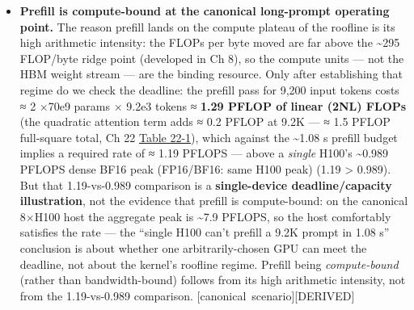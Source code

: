 \begin{itemize}
  \mbox{{[}canonical scenario{]}}\hspace{0pt}\mbox{{[}DERIVED{]}}. (This is an operating-point
  property, not an identity, and it is a \textbf{weight-only} statement:
  at high batch decode climbs the intensity slope. With the canonical
  9.2K KV re-read included, use one denominator rule --- count the
  weight bytes and the KV bytes whenever both terms are in the
  numerator. At batch 1 the intensity is 164.1 GFLOP (140 projection +
  24.1 attention; the attention term is 4·L·d\_model·n\_layers = 4 ×
  9,200 × 8,192 × 80 ≈ 24.1 GFLOP) ÷ (140 GB weights + 24.1 GB of
  canonical 9.2K FP16 KV) ≈ \textbf{1.0 FLOP/byte}. At batch 32 it is 32
  × 164.1 = 5,251 GFLOP ÷ (140 + 32 × 24.1 = 911 GB) ≈ \textbf{5.8
  FLOP/byte}, and it approaches the KV-only asymptote 164.1 ÷ 24.1 ≈ 6.8
  FLOP/byte as batch grows. Every one of these values is far below the
  \textasciitilde295 FLOP/byte ridge, so decode stays bandwidth-bound
  across this batch range --- Ch 8.)
\item
  \textbf{Prefill is compute-bound at the canonical long-prompt
  operating point.} The reason prefill lands on the compute plateau of
  the roofline is its high arithmetic intensity: the FLOPs per byte
  moved are far above the \textasciitilde295 FLOP/byte ridge point
  (developed in Ch 8), so the compute units --- not the HBM weight
  stream --- are the binding resource. Only after establishing that
  regime do we check the deadline: the prefill pass for 9,200 input
  tokens costs ≈ 2 ×70e9 params × 9.2e3 tokens ≈ \textbf{1.29 PFLOP of
  linear (2NL) FLOPs} (the quadratic attention term adds ≈ 0.2 PFLOP at
  9.2K --- ≈ 1.5 PFLOP full-square total, Ch 22 \hyperref[tab:22.1]{Table 22-1}), which
  against the \textasciitilde1.08 s prefill budget implies a required
  rate of ≈ 1.19 PFLOPS --- above a \emph{single} H100's
  \textasciitilde0.989 PFLOPS dense BF16 peak (FP16/BF16: same H100
  peak) (1.19 \textgreater{} 0.989). But that 1.19-vs-0.989 comparison
  is a \textbf{single-device deadline/capacity illustration}, not the
  evidence that prefill is compute-bound: on the canonical 8×H100 host
  the aggregate peak is \textasciitilde7.9 PFLOPS, so the host
  comfortably satisfies the rate --- the ``single H100 can't prefill a
  9.2K prompt in 1.08 s'' conclusion is about whether one
  arbitrarily-chosen GPU can meet the deadline, not about the kernel's
  roofline regime. Prefill being \emph{compute-bound} (rather than
  bandwidth-bound) follows from its high arithmetic intensity, not from
  the 1.19-vs-0.989 comparison. \mbox{{[}canonical scenario{]}}\hspace{0pt}\mbox{{[}DERIVED{]}}
\end{itemize}

